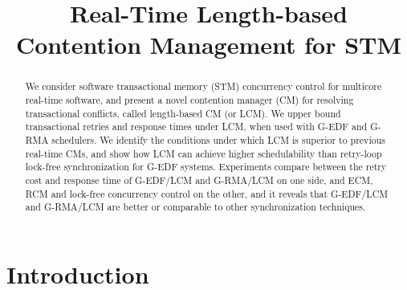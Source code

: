 \documentclass[conference]{sig-alternate}
\begin{document}
\title{Real-Time Length-based Contention Management for STM}

\maketitle

\begin{abstract}
We consider software transactional memory (STM) concurrency control for multicore real-time software, and present a novel contention manager (CM) for resolving transactional conflicts, called length-based CM (or LCM). We upper bound transactional retries and response times under LCM, when used with G-EDF and  G-RMA schedulers. We identify the conditions under which LCM is superior to previous real-time CMs, and show how LCM can achieve higher schedulability than retry-loop lock-free synchronization for G-EDF systems. %
Experiments compare between the retry cost and response time of G-EDF/LCM and G-RMA/LCM on one side, and ECM, RCM and lock-free concurrency control on the other, and it reveals that G-EDF/LCM and G-RMA/LCM are better or comparable to other synchronization techniques.
\end{abstract}


\section{Introduction}
\label{sec:intro}
\end{document}
